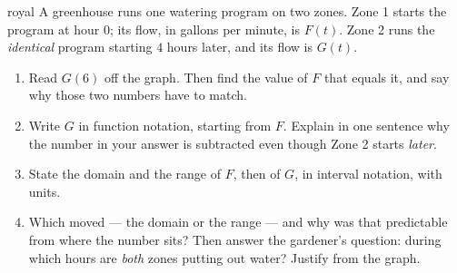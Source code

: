 \documentclass[10pt]{article}
\begin{document}
\vspace{0.10in}

\boxguard[30]
\begin{scenariobox}{royal}
\small
A greenhouse runs one watering program on two zones. Zone 1 starts the program at hour $0$; its
flow, in gallons per minute, is $F(t)$. Zone 2 runs the \emph{identical} program starting $4$ hours
later, and its flow is $G(t)$.

\begin{center}
\end{center}

\begin{enumerate}[leftmargin=1.6em, itemsep=6pt, topsep=2pt, start=6]

\item Read $G(6)$ off the graph. Then find the value of $F$ that equals it, and say why those two
numbers have to match.


\item Write $G$ in function notation, starting from $F$. Explain in one sentence why the number in
your answer is subtracted even though Zone 2 starts \emph{later}.


\item State the domain and the range of $F$, then of $G$, in interval notation, with units.


\item Which moved --- the domain or the range --- and why was that predictable from where the
number sits? Then answer the gardener's question: during which hours are \emph{both} zones putting
out water? Justify from the graph.


\end{enumerate}
\end{scenariobox}
\end{document}
